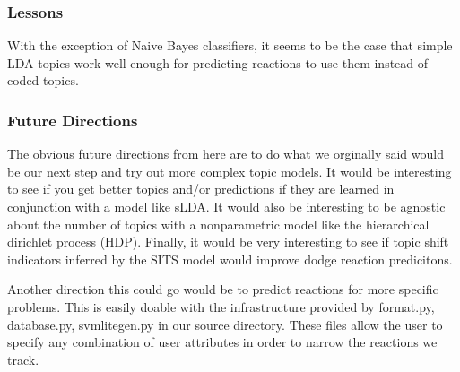 
\subsubsection{Lessons}

With the exception of Naive Bayes classifiers, it seems to be the case that simple LDA topics work well enough for predicting reactions to use them instead of coded topics. 

\subsubsection{Future Directions}

The obvious future directions from here are to do what we orginally said would be our next step and try out more complex topic models.
It would be interesting to see if you get better topics and/or predictions if they are learned in conjunction with a model like sLDA.
It would also be interesting to be agnostic about the number of topics with a nonparametric model like the hierarchical dirichlet process (HDP).
Finally, it would be very interesting to see if topic shift indicators inferred by the SITS model would improve dodge reaction predicitons.

Another direction this could go would be to predict reactions for more specific problems.
This is easily doable with the infrastructure provided by format.py, database.py, svmlitegen.py in our source directory.
These files allow the user to specify any combination of user attributes in order to narrow the reactions we track.

